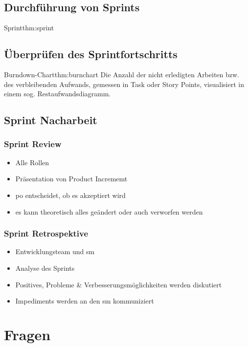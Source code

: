 \documentclass[main.tex]{subfiles}
\begin{document}
\subsection{Durchführung von Sprints}

\begin{myTheorem}{Sprint}{thm:sprint}

\end{myTheorem}
\subsection*{Überprüfen des Sprintfortschritts}
\begin{myTheorem}{Burndown-Chart}{thm:burnchart}
Die Anzahl der nicht erledigten Arbeiten bzw. des verbleibenden Aufwands, gemessen in Task oder Story Points, visualisiert in einem sog. Restaufwandsdiagramm. 
\end{myTheorem}

\subsection*{Sprint Nacharbeit}
\subsubsection*{Sprint Review}
\begin{itemize}
    \item Alle Rollen
    \item Präsentation von Product Incrememt
    \item \gls{po} entscheidet, ob es akzeptiert wird 
    \item es kann theoretisch alles geändert oder auch verworfen werden
\end{itemize}

\subsubsection*{Sprint Retrospektive}
\begin{itemize}
    \item Entwicklungsteam und \gls{sm}
    \item Analyse des Sprints
    \item Positives, Probleme & Verbesserungsmöglichkeiten werden diskutiert
    \item Impediments werden an den \gls{sm} kommuniziert
\end{itemize}


\section{Fragen}
\end{document}
